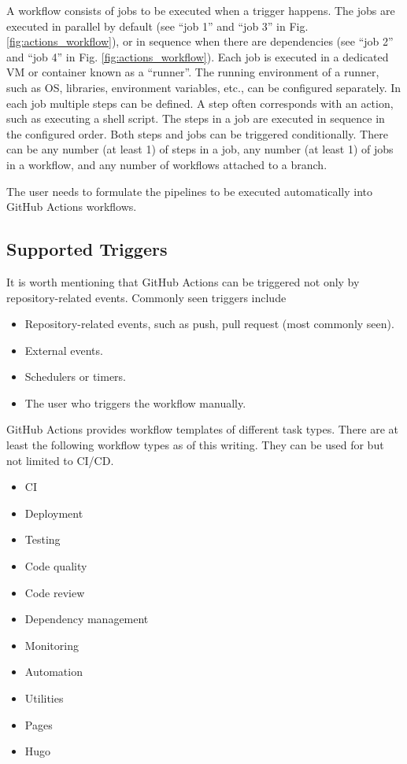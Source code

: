 A workflow consists of jobs to be executed when a trigger happens. The jobs are executed in parallel by default (see ``job 1'' and ``job 3'' in Fig. \ref{fig:actions_workflow}), or in sequence when there are dependencies (see ``job 2'' and ``job 4'' in Fig. \ref{fig:actions_workflow}). Each job is executed in a dedicated VM or container known as a ``runner''. The running environment of a runner, such as OS, libraries, environment variables, etc., can be configured separately. In each job multiple steps can be defined. A step often corresponds with an action, such as executing a shell script. The steps in a job are executed in sequence in the configured order. Both steps and jobs can be triggered conditionally. There can be any number (at least 1) of steps in a job, any number (at least 1) of jobs in a workflow, and any number of workflows attached to a branch.

The user needs to formulate the pipelines to be executed automatically into GitHub Actions workflows.

\subsection{Supported Triggers}

It is worth mentioning that GitHub Actions can be triggered not only by repository-related events. Commonly seen triggers include
\begin{itemize}
	\item Repository-related events, such as push, pull request (most commonly seen).
	\item External events.
	\item Schedulers or timers.
	\item The user who triggers the workflow manually.
\end{itemize}

GitHub Actions provides workflow templates of different task types. There are at least the following workflow types as of this writing. They can be used for but not limited to CI/CD.
\begin{itemize}
	\item CI
	\item Deployment
	\item Testing
	\item Code quality
	\item Code review
	\item Dependency management
	\item Monitoring
	\item Automation
	\item Utilities
	\item Pages
	\item Hugo
\end{itemize}

